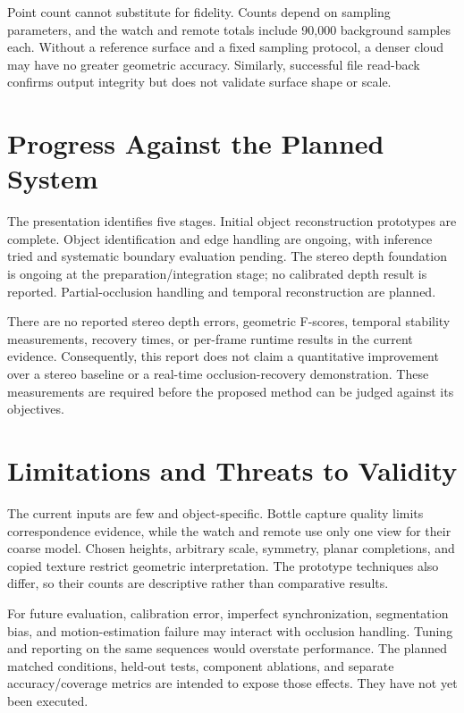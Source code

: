 Point count cannot substitute for fidelity. Counts depend on sampling parameters, and the watch and remote totals include 90,000 background samples each. Without a reference surface and a fixed sampling protocol, a denser cloud may have no greater geometric accuracy. Similarly, successful file read-back confirms output integrity but does not validate surface shape or scale.

\section{Progress Against the Planned System}
The presentation identifies five stages. Initial object reconstruction prototypes are complete. Object identification and edge handling are ongoing, with inference tried and systematic boundary evaluation pending. The stereo depth foundation is ongoing at the preparation/integration stage; no calibrated depth result is reported. Partial-occlusion handling and temporal reconstruction are planned.

There are no reported stereo depth errors, geometric F-scores, temporal stability measurements, recovery times, or per-frame runtime results in the current evidence. Consequently, this report does not claim a quantitative improvement over a stereo baseline or a real-time occlusion-recovery demonstration. These measurements are required before the proposed method can be judged against its objectives.

\section{Limitations and Threats to Validity}
The current inputs are few and object-specific. Bottle capture quality limits correspondence evidence, while the watch and remote use only one view for their coarse model. Chosen heights, arbitrary scale, symmetry, planar completions, and copied texture restrict geometric interpretation. The prototype techniques also differ, so their counts are descriptive rather than comparative results.

For future evaluation, calibration error, imperfect synchronization, segmentation bias, and motion-estimation failure may interact with occlusion handling. Tuning and reporting on the same sequences would overstate performance. The planned matched conditions, held-out tests, component ablations, and separate accuracy/coverage metrics are intended to expose those effects. They have not yet been executed.

